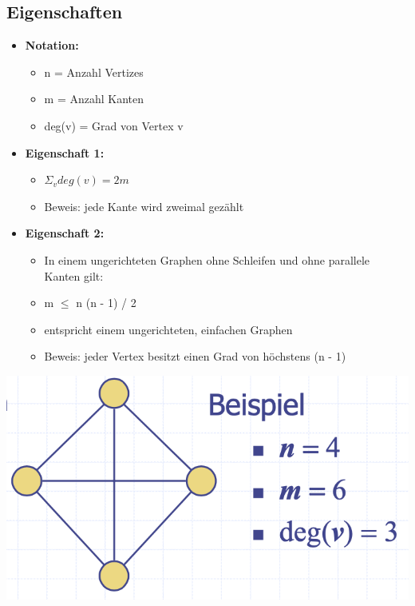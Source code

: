 \subsection{Eigenschaften}
\begin{itemize}
    \item \textbf{Notation:}
    \begin{itemize}
        \item n = Anzahl Vertizes
        \item m = Anzahl Kanten
        \item deg(v) = Grad von Vertex v
    \end{itemize}
    \item \textbf{Eigenschaft 1:}
    \begin{itemize}
        \item $\Sigma_v deg(v) = 2m$
        \item Beweis: jede Kante wird zweimal gezählt
    \end{itemize}
    \item \textbf{Eigenschaft 2:}
     \begin{itemize}
        \item In einem ungerichteten Graphen ohne Schleifen und ohne parallele Kanten gilt:
        \item m $\leqslant$  n (n - 1) / 2
        \item entspricht einem ungerichteten, einfachen Graphen
        \item Beweis: jeder Vertex besitzt einen Grad von höchstens (n - 1)
     \end{itemize}
\end{itemize}

\vspace{-8pt}
\begin{center}
    \includegraphics[scale=.25]{graphic/11 Graph/Eigenschaften.png}
\end{center}
\vspace{-8pt}


